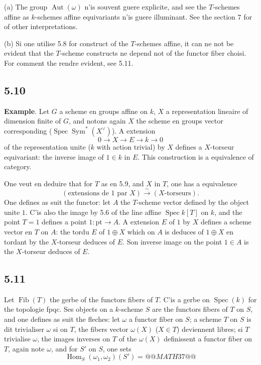 \documentclass[12pt,a4paper]{article}
\theoremstyle{plain}
\theoremstyle{definition}
\theoremstyle{remark}
\DeclareMathOperator{\Aut}{Aut}
\DeclareMathOperator{\Hom}{Hom}
\DeclareMathOperator{\Spec}{Spec}
\DeclareMathOperator{\Sym}{Sym}
\DeclareMathOperator{\Fib}{Fib}
\newcommand{\pt}{\mathrm{pt}}
\begin{document}
(a) The group $\Aut(\omega)$ n'is souvent guere explicite, and see the $T$-schemes affine as $k$-schemes affine equivariants n'is guere illuminant. See the section 7 for of other interpretations.

(b) Si one utilise 5.8 for construct of the $T$-schemes affine, it can ne not be evident that the $T$-scheme constructs ne depend not of the functor fiber choisi. For comment the rendre evident, see 5.11.

\subsection*{5.10}
\textbf{Example}. Let $G$ a scheme en groups affine on $k$, $X$ a representation lineaire of dimension finite of $G$, and notons again $X$ the scheme en groups vector corresponding ($\Spec 
\Sym^*(X^\vee)$). A extension
\[
0 
\longrightarrow X 
\longrightarrow E 
\longrightarrow k 
\longrightarrow 0
\]
of the representation unite ($k$ with action trivial) by $X$ defines a $X$-torseur equivariant: the inverse image of $1 
\in k$ in $E$. This construction is a equivalence of category.

One veut en deduire that for $T$ as en 5.9, and $X$ in $T$, one has a equivalence
\[
(\text{extensions de } 1 \text{ par } X) 
\xrightarrow{\sim} (X\text{-torseurs}).
\]
One defines as suit the functor: let $A$ the $T$-scheme vector defined by the object unite $1$. C'is also the image by 5.6 of the line affine $\Spec k[T]$ on $k$, and the point $T=1$ defines a point $1: 
\pt 
\to A$. A extension $E$ of $1$ by $X$ defines a scheme vector en $T$ on $A$: the tordu $E$ of $1 
\oplus X$ which on $A$ is deduces of $1 
\oplus X$ en tordant by the $X$-torseur deduces of $E$. Son inverse image on the point $1 
\in A$ is the $X$-torseur deduces of $E$.

\subsection*{5.11}
Let $\Fib(T)$ the gerbe of the functors fibers of $T$. C'is a gerbe on $\Spec(k)$ for the topologie fpqc. Ses objects on a $k$-scheme $S$ are the functors fibers of $T$ on $S$, and one defines as suit the fleches: let $\omega$ a functor fiber on $S$; a scheme $T$ on $S$ is dit trivialiser $\omega$ si on $T$, the fibers vector $\omega(X)$ ($X 
\in T$) deviennent libres; si $T$ trivialise $\omega$, the images inverses on $T$ of the $\omega(X)$ definissent a functor fiber on $T$, again note $\omega$, and for $S'$ on $S$, one sets
\[
\Hom_S(\omega_1,\omega_2)(S') = 
@@MATH37@@
\]
\end{document}
